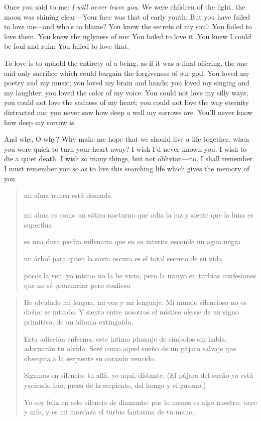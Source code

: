 \documentclass[a4paper, 12pt]{article}
\begin{document}
Once you said to me: \textit{I will never leave you.} We were children of the
light, the moon was shining clear---Your face was that of early youth. But you
have failed to love me---and who's to blame? You knew the secrets of my soul:
You failed to love them. You knew the uglyness of me: You failed to love it. You
knew I could be foul and ruin: You failed to love that.

To love is to uphold the entirety of a being, as if it was a final offering,
the one and only sacrifice which could bargain the forgiveness of our god.
You loved my poetry and my music;
you loved my brain and hands; you loved my singing and my laughter; you loved
the color of my voice. You could not love my silly ways; you could not love the
sadness of my heart; you could not love the way eternity distracted me; you never
saw how deep a well my sorrows are. You'll never know how deep my sorrow is.

And why, O why? Why make me hope that we should live a life together, when you
were quick to turn your heart away? I wish I'd never known you. I wish to die a
quiet death. I wish so many things, but not oblivion---no. I shall remember. I
must remember you so as to live this searching life which gives the memory of
you. 

\pagebreak 

\begin{verse}
    
mi alma nunca está desnuda\\

\\ 

mi alma es como un sátiro nocturno
que odia la luz y siente que la luna es superflua

es una dura piedra milenaria
que en su interior esconde un agua negra

un árbol para quien la savia oscura
es el total secreto de su vida

pocos la ven, yo mismo no la he visto,
pero la intuyo en turbias confesiones
que no sé pronunciar pero confieso




\end{verse}

\pagebreak

\begin{verse}
    He olvidado mi lengua, mi voz y mi lenguaje.
    Mi mundo silencioso no es dicho: es intuido.
    Y siento entre nosotros el místico oleaje 
    de un signo primitivo, de un idioma extinguido.

    Esta adicción enferma, este íntimo plumaje 
    de símbolos sin habla, adornarán tu olvido.
    Seré como aquel sueño de un pájaro salvaje
    que obsequia a la serpiente su corazón vencido.

    Sigamos en silencio, tu allá, yo aquí, distante.
    (El pájaro del sueño ya está yaciendo frío,
    presa de la serpiente, del hongo y el gusano.)

    Yo soy feliz en este silencio de diamante:
    por lo menos es algo nuestro, tuyo y mío,
    y es mi mordaza el turbio fantasma de tu mano.

    \end{verse}
\end{document}
